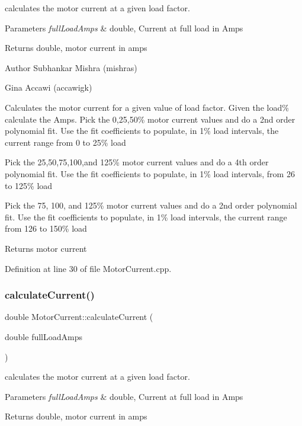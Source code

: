 calculates the motor current at a given load factor. 
\begin{DoxyParams}{Parameters}
{\em full\+Load\+Amps} & double, Current at full load in Amps \\
\hline
\end{DoxyParams}
\begin{DoxyReturn}{Returns}
double, motor current in amps
\end{DoxyReturn}
\begin{DoxyAuthor}{Author}
Subhankar Mishra (mishras) 

Gina Accawi (accawigk) 
\end{DoxyAuthor}
Calculates the motor current for a given value of load factor. Given the load\% calculate the Amps. Pick the 0,25,50\% motor current values and do a 2nd order polynomial fit. Use the fit coefficients to populate, in 1\% load intervals, the current range from 0 to 25\% load

Pick the 25,50,75,100,and 125\% motor current values and do a 4th order polynomial fit. Use the fit coefficients to populate, in 1\% load intervals, from 26 to 125\% load

Pick the 75, 100, and 125\% motor current values and do a 2nd order polynomial fit. Use the fit coefficients to populate, in 1\% load intervals, the current range from 126 to 150\% load \begin{DoxyReturn}{Returns}
motor current 
\end{DoxyReturn}


Definition at line 30 of file Motor\+Current.\+cpp.

\mbox{\label{class_motor_current_aa08b2f8ba065b24908c7e1b80cadb4f6}} 
\subsubsection{\texorpdfstring{calculate\+Current()}{calculateCurrent()}\hspace{0.1cm}{\footnotesize\ttfamily [2/3]}}
{\footnotesize\ttfamily double Motor\+Current\+::calculate\+Current (\begin{DoxyParamCaption}\item[{double}]{full\+Load\+Amps }\end{DoxyParamCaption})}

calculates the motor current at a given load factor. 
\begin{DoxyParams}{Parameters}
{\em full\+Load\+Amps} & double, Current at full load in Amps \\
\hline
\end{DoxyParams}
\begin{DoxyReturn}{Returns}
double, motor current in amps 
\end{DoxyReturn}
\mbox{\label{class_motor_current_aa08b2f8ba065b24908c7e1b80cadb4f6}} 

